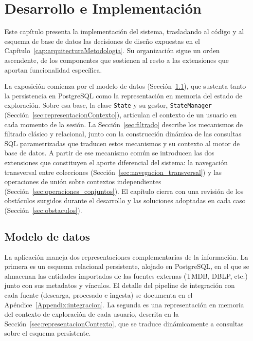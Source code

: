 

\chapter{Desarrollo e Implementación}
\label{cap:desarrolloImplementacion}

Este capítulo presenta la implementación del sistema, trasladando al
código y al esquema de base de datos las decisiones de diseño expuestas
en el Capítulo~\ref{cap:arquitecturaMetodologia}. Su organización sigue
un orden ascendente, de los componentes que sostienen al resto a las
extensiones que aportan funcionalidad específica.

La exposición comienza por el modelo de datos
(Sección~\ref{sec:modeloDatos}), que sustenta tanto la persistencia en
PostgreSQL como la representación en memoria del estado de exploración.
Sobre esa base, la clase \texttt{State} y su gestor,
\texttt{StateManager} (Sección~\ref{sec:representacionContexto}),
articulan el contexto de un usuario en cada momento de la sesión. La
Sección~\ref{sec:filtrado} describe los mecanismos de filtrado clásico
y relacional, junto con la construcción dinámica de las consultas SQL
parametrizadas que traducen estos mecanismos y su contexto al motor de base de datos. A partir
de ese mecanismo común se introducen las dos extensiones que
constituyen el aporte diferencial del sistema: la navegación
transversal entre colecciones
(Sección~\ref{sec:navegacion_transversal}) y las operaciones de unión
sobre contextos independientes
(Sección~\ref{sec:operaciones_conjuntos}). El capítulo cierra con una
revisión de los obstáculos surgidos durante el desarrollo y las
soluciones adoptadas en cada caso (Sección~\ref{sec:obstaculos}).

\section{Modelo de datos}
\label{sec:modeloDatos}

La aplicación maneja dos representaciones complementarias de la
información. La primera es un esquema relacional persistente, alojado
en PostgreSQL, en el que se almacenan las entidades importadas de las
fuentes externas (TMDB, DBLP, etc.) junto con sus metadatos y vínculos.
El detalle del pipeline de integración con cada fuente (descarga,
procesado e ingesta) se documenta en el
Apéndice~\ref{Appendix:integracion}.
La segunda es una representación en memoria del contexto de exploración
de cada usuario, descrita en la
Sección~\ref{sec:representacionContexto}, que se traduce dinámicamente
a consultas sobre el esquema persistente.

